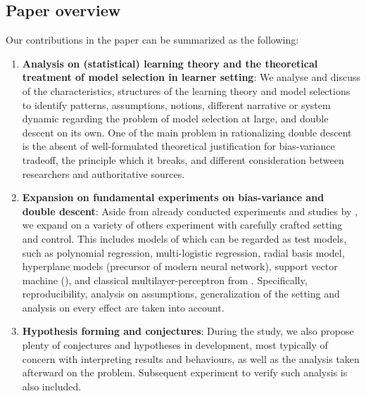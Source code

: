\documentclass[10pt]{article}
\begin{document}
\subsection{Paper overview}
Our contributions in the paper can be summarized as the following:
\begin{enumerate}[topsep=1pt,itemsep=0.6pt,leftmargin=*]
  \item \textbf{Analysis on (statistical) learning theory and the theoretical treatment of model selection in learner setting}: We analyse and discuss of the characteristics, structures of the learning theory and model selections to identify patterns, assumptions, notions, different narrative or system dynamic regarding the problem of model selection at large, and double descent on its own. One of the main problem in rationalizing double descent is the absent of well-formulated theoretical justification for bias-variance tradeoff, the principle which it breaks, and different consideration between researchers and authoritative sources. 
  \item \textbf{Expansion on fundamental experiments on bias-variance and double descent}: Aside from already conducted experiments and studies by \cite{sharma_bias-variance_2014,schaeffer_double_2023,nakkiran_deep_2019,belkin_reconciling_2019,6797087,unified_bias_composition,Scott_Fortmann_Bias,neal2019biasvariancetradeofftextbooksneed}, we expand on a variety of others experiment with carefully crafted setting and control. This includes models of which can be regarded as test models, such as polynomial regression, multi-logistic regression, radial basis model, hyperplane models (precursor of modern neural network), support vector machine (\cite{Cristianini2000AnIT}), and classical multilayer-perceptron from \cite{goodfellow2016deep}. Specifically, reproducibility, analysis on assumptions, generalization of the setting and analysis on every effect are taken into account. 
  \item \textbf{Hypothesis forming and conjectures}: During the study, we also propose plenty of conjectures and hypotheses in development, most typically of concern with interpreting results and behaviours, as well as the analysis taken afterward on the problem. Subsequent experiment to verify such analysis is also included. %
\end{enumerate}
\end{document}
